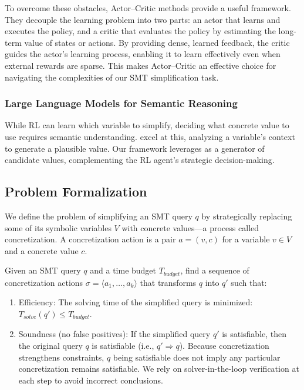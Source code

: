 To overcome these obstacles, Actor–Critic methods provide a useful framework. They decouple the learning problem into two parts: an actor that learns and executes the policy, and a critic that evaluates the policy by estimating the long-term value of states or actions. By providing dense, learned feedback, the critic guides the actor's learning process, enabling it to learn effectively even when external rewards are sparse. This makes Actor–Critic an effective choice for navigating the complexities of our SMT simplification task.

\subsubsection{Large Language Models for Semantic Reasoning}
While RL can learn which variable to simplify, deciding what concrete value to use requires semantic understanding. \LLM{} excel at this, analyzing a variable's context to generate a plausible value. Our framework leverages \LLM{} as a generator of candidate values, complementing the RL agent's strategic decision-making.

\subsection{Problem Formalization}
\label{sec:problem-formalization}

We define the problem of simplifying an SMT query $q$ by strategically replacing some of its symbolic variables $V$ with concrete values—a process called concretization. A concretization action is a pair $a = (v, c)$ for a variable $v \in V$ and a concrete value $c$. 

\begin{problem}
\label{problem:optimal-simplification}
Given an SMT query $q$ and a time budget $T_{budget}$, find a sequence of concretization actions $\sigma = \langle a_1, \dots, a_k \rangle$ that transforms $q$ into $q'$ such that:
\begin{enumerate}
    \item Efficiency: The solving time of the simplified query is minimized: $T_{solve}(q') \le T_{budget}$.
    \item Soundness (no false positives): If the simplified query $q'$ is satisfiable, then the original query $q$ is satisfiable (i.e., $q' \Rightarrow q$). Because concretization strengthens constraints, $q$ being satisfiable does not imply any particular concretization remains satisfiable. We rely on solver-in-the-loop verification at each step to avoid incorrect conclusions.
\end{enumerate}
\end{problem}

